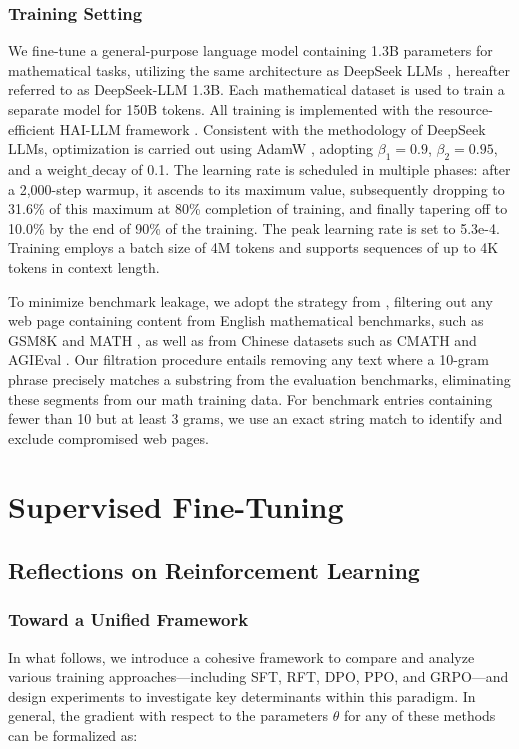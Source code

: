 \begin{itemize}[topsep=0pt]
\subsubsection{Training Setting}
\label{sec:quality-policy}
We fine-tune a general-purpose language model containing 1.3B parameters for mathematical tasks, utilizing the same architecture as DeepSeek LLMs \citep{deepseek-llm}, hereafter referred to as DeepSeek-LLM 1.3B. Each mathematical dataset is used to train a separate model for 150B tokens. All training is implemented with the resource-efficient HAI-LLM framework \citep{haillm}. Consistent with the methodology of DeepSeek LLMs, optimization is carried out using AdamW \citep{adamW}, adopting $\beta_1=0.9$, $\beta_2=0.95$, and a $\mathrm{weight\_decay}$ of 0.1. The learning rate is scheduled in multiple phases: after a 2,000-step warmup, it ascends to its maximum value, subsequently dropping to 31.6\% of this maximum at 80\% completion of training, and finally tapering off to 10.0\% by the end of 90\% of the training. The peak learning rate is set to 5.3e-4. Training employs a batch size of 4M tokens and supports sequences of up to 4K tokens in context length.

To minimize benchmark leakage, we adopt the strategy from \cite{deepseek-coder}, filtering out any web page containing content from English mathematical benchmarks, such as GSM8K \citep{gsm8k} and MATH \citep{MATH}, as well as from Chinese datasets such as CMATH \citep{wei2023cmath} and AGIEval \citep{agieval}. Our filtration procedure entails removing any text where a 10-gram phrase precisely matches a substring from the evaluation benchmarks, eliminating these segments from our math training data. For benchmark entries containing fewer than 10 but at least 3 grams, we use an exact string match to identify and exclude compromised web pages.

\section{Supervised Fine-Tuning}

\subsection{Reflections on Reinforcement Learning}
\subsubsection{Toward a Unified Framework} In what follows, we introduce a cohesive framework to compare and analyze various training approaches—including SFT, RFT, DPO, PPO, and GRPO—and design experiments to investigate key determinants within this paradigm. In general, the gradient with respect to the parameters $\theta$ for any of these methods can be formalized as:


\end{itemize}
